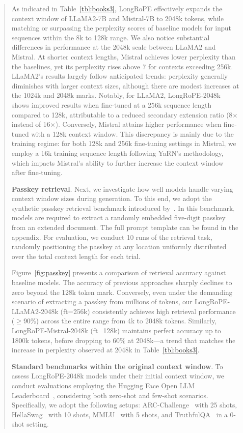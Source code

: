 \begin{abstract}
As indicated in Table~\ref{tbl:books3}, LongRoPE effectively expands the context window of LLaMA2-7B and Mistral-7B to 2048k tokens, while matching or surpassing the perplexity scores of baseline models for input sequences within the 8k to 128k range. We also notice substantial differences in performance at the 2048k scale between LLaMA2 and Mistral. At shorter context lengths, Mistral achieves lower perplexity than the baselines, yet its perplexity rises above 7 for contexts exceeding 256k. LLaMA2’s results largely follow anticipated trends: perplexity generally diminishes with larger context sizes, although there are modest increases at the 1024k and 2048k marks. Notably, for LLaMA2, LongRoPE-2048k shows improved results when fine-tuned at a 256k sequence length compared to 128k, attributable to a reduced secondary extension ratio (8$\times$ instead of 16$\times$). Conversely, Mistral attains higher performance when fine-tuned with a 128k context window. This discrepancy is mainly due to the training regime: for both 128k and 256k fine-tuning settings in Mistral, we employ a 16k training sequence length following YaRN's methodology, which impacts Mistral's ability to further increase the context window after fine-tuning.

\textbf{Passkey retrieval}. Next, we investigate how well models handle varying context window sizes during generation. To this end, we adopt the synthetic passkey retrieval benchmark introduced by~\cite{passkey}. In this benchmark, models are required to extract a randomly embedded five-digit passkey from an extended document. The full prompt template can be found in the appendix. For evaluation, we conduct 10 runs of the retrieval task, randomly positioning the passkey at any location uniformly distributed over the total context length for each trial.

Figure~\ref{fig:passkey} presents a comparison of retrieval accuracy against baseline models. The accuracy of previous approaches sharply declines to zero beyond the 128k token mark. Conversely, even under the demanding scenario of extracting a passkey from millions of tokens, our LongRoPE-LLaMA2-2048k (ft=256k) consistently achieves high retrieval performance ($\ge$90\%) across the entire range from 4k to 2048k tokens. Similarly, LongRoPE-Mistral-2048k (ft=128k) maintains perfect accuracy up to 1800k tokens, before dropping to 60\% at 2048k—a trend that matches the increase in perplexity observed at 2048k in Table~\ref{tbl:books3}.

\textbf{Standard benchmarks within the original context window}. To assess LongRoPE-2048k models under their initial context window, we conduct evaluations employing the Hugging Face Open LLM Leaderboard~\cite{huggingfaceboard}, considering both zero-shot and few-shot scenarios. Specifically, we adopt the following setups: ARC-Challenge~\cite{allenai:arc} with 25 shots, HellaSwag~\cite{zellers2019hellaswag} with 10 shots, MMLU~\cite{mmlu} with 5 shots, and TruthfulQA~\cite{lin2021truthfulqa} in a 0-shot setting.


\end{abstract}
